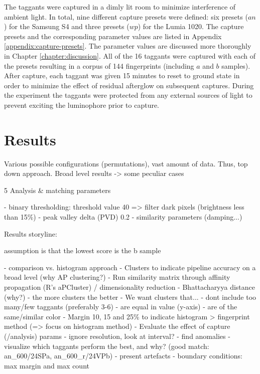 \documentclass[thesis.tex]{subfiles}
\begin{document}
The taggants were captured in a dimly lit room to minimize interference of ambient light. In total, nine different capture presets were defined: six presets ($an$) for the Samsung S4 and three presets ($wp$) for the Lumia 1020. The capture presets and the corresponding parameter values are listed in Appendix \ref{appendix:capture-presets}. The parameter values are discussed more thoroughly in Chapter \ref{chapter:discussion}. All of the 16 taggants were captured with each of the presets resulting in a corpus of 144 fingerprints (including $a$ and $b$ samples). After capture, each taggant was given 15 minutes to reset to ground state in order to minimize the effect of residual afterglow on subsequent captures. During the experiment the taggants were protected from any external sources of light to prevent exciting the luminophore prior to capture.

\section{Results}
\label{chapter:results}

Various possible configurations (permutations), vast amount of data. Thus, top down approach. Broad level results -> some peculiar cases


5 Analysis \& matching parameters

- binary thresholding: threshold value 40 => filter dark pixels (brightness less than 15\%)
- peak valley delta (PVD) 0.2
- similarity parameters (damping...)

Results storyline:

assumption is that the lowest score is the b sample

- comparison vs. histogram approach
- Clusters to indicate pipeline accuracy on a broad level (why AP clustering?)
  - Run similarity matrix through affinity propagation (R's aPCluster) / dimensionality reduction
  - Bhattacharyya distance (why?)
  - the more clusters the better
  - We want clusters that...
    - dont include too many/few taggants (preferably 3-6)
    - are equal in value (y-axis)
    - are of the same/similar color
- Margin 10, 15 and 25\% to indicate histogram > fingerprint method (=> focus on histogram method)
- Evaluate the effect of capture (/analysis) params
  - ignore resolution, look at interval?
  - find anomalies
  - visualize which taggants perform the best, and why? (good match: an\_600/24SPa, an\_600\_r/24VPb)
- present artefacts
- boundary conditions: max margin and max count
\end{document}
